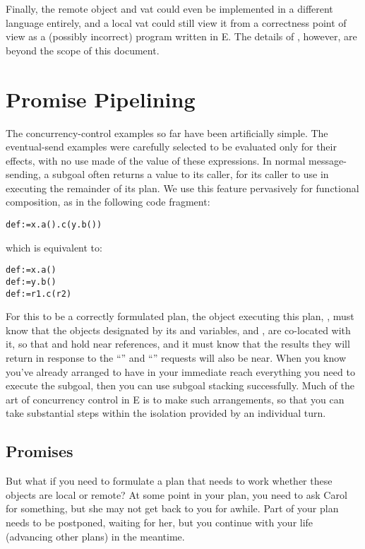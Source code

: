 \documentclass{llncs}
\begin{document}
Finally, the remote object and vat could even be implemented in a
different language entirely, and a local vat could still view it from
a correctness point of view as a (possibly incorrect) program written
in E.  The details of , however, are beyond the scope of
this document.

\section{Promise Pipelining}

The concurrency-control examples so far have been artificially
simple. The eventual-send examples were carefully selected to be
evaluated only for their effects, with no use made of the value of
these expressions. In normal message-sending, a subgoal often returns a
value to its caller, for its caller to use in executing the remainder
of its plan. We use this feature pervasively for functional
composition, as in the following code fragment:
%
\begin{alltt}
    def  := x.a().c(y.b())
\end{alltt}
%
which is equivalent to:
%
\begin{alltt}
    def  := x.a() 
    def  := y.b() 
    def  := r1.c(r2)
\end{alltt}
%
For this to be a correctly formulated plan, the object executing this
plan, , must know that the objects designated by its 
and  variables,  and , are co-located with it,
so that  and  hold near references, and it must know
that the results they will return in response to the ``''
and ``'' requests will also be near. When you know you've
already arranged to have in your immediate reach everything you need
to execute the subgoal, then you can use subgoal stacking
successfully. Much of the art of concurrency control in E is to make
such arrangements, so that you can take substantial steps within the
isolation provided by an individual turn.

\subsection{Promises}

But what if you need to formulate a plan that needs to work whether
these objects are local or remote?  At some point in your plan, you need to ask Carol for
something, but she may not get back to you for awhile. Part of your
plan needs to be postponed, waiting for her, but you continue with
your life (advancing other plans) in the meantime.
\end{document}

